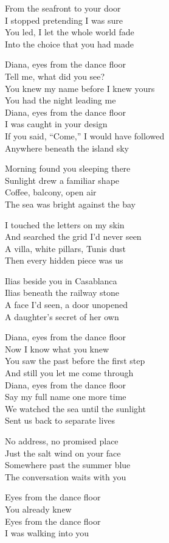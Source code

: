 \begin{lyrics}
From the seafront to your door\\
I stopped pretending I was sure\\
You led, I let the whole world fade\\
Into the choice that you had made

Diana, eyes from the dance floor\\
Tell me, what did you see?\\
You knew my name before I knew yours\\
You had the night leading me\\
Diana, eyes from the dance floor\\
I was caught in your design\\
If you said, “Come,” I would have followed\\
Anywhere beneath the island sky

Morning found you sleeping there\\
Sunlight drew a familiar shape\\
Coffee, balcony, open air\\
The sea was bright against the bay

I touched the letters on my skin\\
And searched the grid I’d never seen\\
A villa, white pillars, Tunis dust\\
Then every hidden piece was us

Ilias beside you in Casablanca\\
Ilias beneath the railway stone\\
A face I’d seen, a door unopened\\
A daughter’s secret of her own

Diana, eyes from the dance floor\\
Now I know what you knew\\
You saw the past before the first step\\
And still you let me come through\\
Diana, eyes from the dance floor\\
Say my full name one more time\\
We watched the sea until the sunlight\\
Sent us back to separate lives

No address, no promised place\\
Just the salt wind on your face\\
Somewhere past the summer blue\\
The conversation waits with you

Eyes from the dance floor\\
You already knew\\
Eyes from the dance floor\\
I was walking into you
\end{lyrics}
